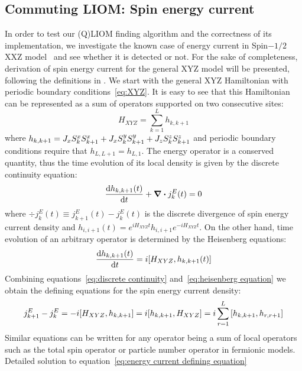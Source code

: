 \subsection{Commuting LIOM: Spin energy current\label{sec:energy current}}
In order to test our (Q)LIOM finding algorithm and the correctness of its implementation, we investigate the known case of
energy current in Spin\(-1/2\) XXZ model~\autocite*{Mierzejewski2015Approx} and see whether it is detected or not.
For the sake of completeness, derivation of
spin energy current for the general XYZ model will be presented, following the definitions in \textcite{Zotos1997}.
We start with the general XYZ Hamiltonian with periodic boundary conditions~\eqref{eq:XYZ}.
It is easy to see that this Hamiltonian can be represented as a sum of operators supported on two consecutive sites:
\begin{equation}
  H_{XYZ} = \sum_{k=1}^L h_{k,k+1}
\end{equation}
where \(h_{k,k+1} = J_{x} S^{x}_{k}S^{x}_{k+1} + J_{x} S^{y}_{k}S^{y}_{k+1} + J_{z} S^{z}_{k}S^{z}_{k+1} \) and periodic boundary conditions
require that \(h_{L,L+1} = h_{L,1}\). The energy operator is a conserved quantity, thus the time evolution of its local density
is given by the discrete continuity equation:
\begin{equation}
  \dv{h_{k,k+1}(t)}{t} + \div{j_{k}^{E}(t)} = 0
  \label{eq:discrete continuity}
\end{equation}
where \(\div{j_{k}^E(t)} \equiv j_{k+1}^E(t) - j_{k}^E(t)\) is the discrete divergence of spin energy current density and \(h_{i,i+1}(t) = e^{i H_{XYZ}t} h_{i,i+1} e^{-i H_{XYZ} t}\).
On the other hand, time evolution of an arbitrary operator is determined
by the Heisenberg equations:
\begin{equation}
  \dv{h_{k,k+1}(t)}{t} = i \comm{H_{XYZ}}{h_{k,k+1}(t)}
  \label{eq:heisenberg equation}
\end{equation}
Combining equations~\eqref{eq:discrete continuity} and~\eqref{eq:heisenberg equation} we obtain the defining equations for
the spin energy current density:
\begin{equation}
  j_{k+1}^E - j_{k}^E = - i \comm{H_{XYZ}}{h_{k,k+1}} = i \comm{h_{k,k+1}}{H_{XYZ}} = i \sum_{r=1}^L \comm{h_{k,k+1}}{h_{r,r+1}}
  \label{eq:energy current defining equation}
\end{equation}
Similar equations can be written for any operator being a sum of local operators such as
the total spin operator or particle number operator in fermionic models. Detailed solution to equation~\eqref{eq:energy current defining equation}
